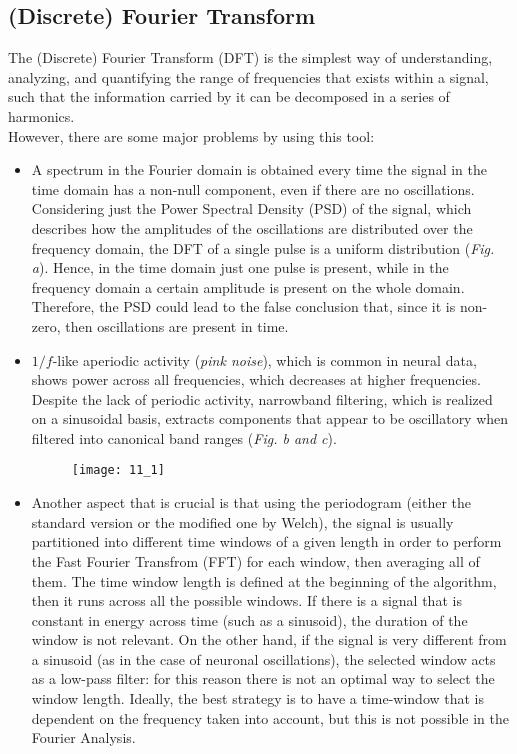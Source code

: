 \subsection{(Discrete) Fourier Transform}
The (Discrete) Fourier Transform (DFT) is the simplest way of understanding, analyzing, and
quantifying the range of frequencies that exists within a signal, such that the information
carried by it can be decomposed in a series of harmonics.\\
However, there are some major problems by using this tool:
\begin{itemize}
    \item A spectrum in the Fourier domain is obtained every time the signal in the time domain
          has a non-null component, even if there are no oscillations. Considering just the Power
          Spectral Density (PSD) of the signal, which describes how the amplitudes of the
          oscillations are distributed over the frequency domain, the DFT of a single pulse is a
          uniform distribution (\textit{Fig. a}). Hence, in the time domain just one pulse is present, while in the
          frequency domain a certain amplitude is present on the whole domain. Therefore, the PSD
          could lead to the false conclusion that, since it is non-zero, then oscillations are
          present in time.
    \item \(1/f\)-like aperiodic activity (\textit{pink noise}), which is common in neural data,
          shows power across all frequencies, which decreases at higher frequencies. Despite the lack
          of periodic activity, narrowband filtering, which is realized on a sinusoidal basis, extracts
          components that appear to be oscillatory when filtered into canonical band ranges (\textit{Fig. b and c}).
          \begin{figure}[H]
              \texttt{[image: 11\_1]}
              \centering
          \end{figure}
    \item Another aspect that is crucial is that using the periodogram (either the standard version
          or the modified one by Welch), the signal is usually partitioned into different time windows of a
          given length in order to perform the Fast Fourier Transfrom (FFT) for each window, then averaging
          all of them. The time window length is defined at the beginning of the algorithm, then it runs across
          all the possible windows. If there is a signal that is constant in energy across time (such as a sinusoid),
          the duration of the window is not relevant. On the other hand, if the signal is very different from
          a sinusoid (as in the case of neuronal oscillations), the selected window acts as a low-pass filter:
          for this reason there is not an optimal way to select the window length. Ideally, the best strategy
          is to have a time-window that is dependent on the frequency taken into account, but this is not possible
          in the Fourier Analysis.
\end{itemize}

